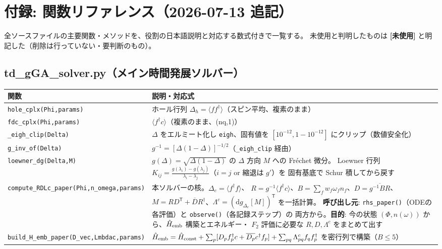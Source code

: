 \documentclass[11pt]{ltjsarticle}
\newcommand{\code}[1]{\texttt{#1}}
\begin{document}
\appendix
\section{付録: 関数リファレンス（2026-07-13 追記）}

全ソースファイルの主要関数・メソッドを、役割の日本語説明と対応する数式付きで一覧する。
未使用と判明したものは \textbf{[未使用]} と明記した（削除は行っていない・要判断のもの）。

\subsection*{td\_gGA\_solver.py（メイン時間発展ソルバー）}

\begin{longtable}{p{}p{}}
\toprule
関数 & 説明・対応式 \\
\midrule
\code{hole\_cplx(Phi,params)} & ホール行列 $\Delta_h=\langle f f^\dagger\rangle$（スピン平均、複素のまま）\\
\code{fdc\_cplx(Phi,params)} & $\langle f^\dagger c\rangle$（複素のまま、(nq,1)）\\
\code{\_eigh\_clip(Delta)} & $\Delta$ をエルミート化し \code{eigh}、固有値を $[10^{-12},1{-}10^{-12}]$ にクリップ（数値安全化）\\
\code{g\_inv\_of(Delta)} & $g^{-1}=[\Delta(1-\Delta)]^{-1/2}$（\code{\_eigh\_clip} 経由）\\
\code{loewner\_dg(Delta,M)} & $g(\Delta)=\sqrt{\Delta(1-\Delta)}$ の $\Delta$ 方向 $M$ への Fréchet 微分。
Loewner 行列 $K_{ij}=\frac{g(\lambda_i)-g(\lambda_j)}{\lambda_i-\lambda_j}$（$i=j$ or 縮退は $g'$）を
固有基底で Schur 積してから戻す \\
\code{compute\_RDLc\_paper(Phi,n\_omega,params)} & 本ソルバーの核。$\Delta_e=\langle f^\dagger f\rangle$、
$R=g^{-1}\langle f^\dagger c\rangle$、$B=\sum_f w_f\omega_f n_f$、$D=\overline{g^{-1}BR}$、
$M=RD^{\mathsf T}+\overline{D}R^\dagger$、$\Lambda^c=(\mathrm{d}g_{\Delta_e}[M])^{\mathsf T}$ を一括計算。
\textbf{呼び出し元}: \code{rhs\_paper()}（ODEの各評価）と \code{observe()}（各記録ステップ）の
両方から。\textbf{目的}: 今の状態 $(\Phi,n(\omega))$ から、$\hat H_{\rm emb}$ 構築とエネルギー・
$F_2$ 評価に必要な $R,D,\Lambda^c$ をまとめて出す \\
\code{build\_H\_emb\_paper(D\_vec,Lmbdac,params)} & $\hat H_{\rm emb}=\hat H_{\rm const}
+\sum_p[D_p f_p^\dagger c+\overline{D_p}c^\dagger f_p]+\sum_{pq}\Lambda^c_{pq}f_qf_p^\dagger$
を密行列で構築（$B\le5$）\\

\end{longtable}
\end{document}
